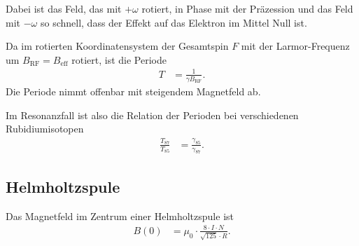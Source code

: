 Dabei ist das Feld, das mit $+\omega$ rotiert, in Phase mit der
Präzession und das Feld mit $-\omega$ so schnell, dass der Effekt auf das
Elektron im Mittel Null ist.

Da im rotierten Koordinatensystem der Gesamtspin $F$ mit der Larmor-Frequenz um
$B_\text{RF} = B_\text{eff}$ rotiert, ist die Periode
\begin{align}
  \label{eq:larmor_periode}
  T &= \frac{1}{\gamma B_\text{RF}}.
\end{align}
Die Periode nimmt offenbar mit steigendem Magnetfeld ab.

Im Resonanzfall ist also die Relation der Perioden bei verschiedenen Rubidiumisotopen
\begin{align}
  \label{eq:resonanz_perioden}
  \frac{T_{87}}{T_{85}} &= \frac{\gamma_{85}}{\gamma_{87}}.
\end{align}


\subsection{Helmholtzspule}%
\label{sub:helmholtzspule}
Das Magnetfeld im Zentrum einer Helmholtzspule ist
\begin{align}
  B(0) &= \mu_{0} \cdot \frac{8 \cdot I \cdot N}{\sqrt{125} \cdot R}.
\end{align}
